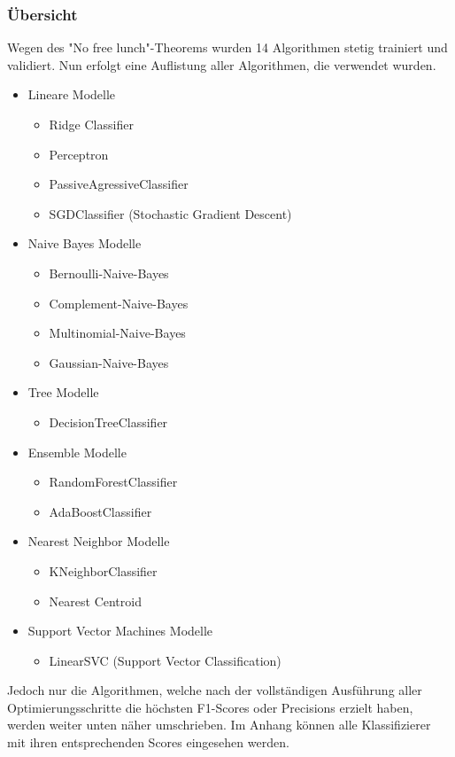 \subsubsection{Übersicht}
Wegen des "No free lunch"-Theorems wurden 14 Algorithmen stetig trainiert und validiert.
Nun erfolgt eine Auflistung aller Algorithmen, die verwendet wurden.
\begin{itemize}
	\item Lineare Modelle
	\begin{itemize}
		\item Ridge Classifier
		\item Perceptron
		\item PassiveAgressiveClassifier
		\item SGDClassifier (Stochastic Gradient Descent)
	\end{itemize}
	\item Naive Bayes Modelle
	\begin{itemize}
		\item Bernoulli-Naive-Bayes
		\item Complement-Naive-Bayes
		\item Multinomial-Naive-Bayes
		\item Gaussian-Naive-Bayes
	\end{itemize}
	\item Tree Modelle
	\begin{itemize}
		\item DecisionTreeClassifier
	\end{itemize}
	\item Ensemble Modelle
	\begin{itemize}
		\item RandomForestClassifier
		\item AdaBoostClassifier
	\end{itemize}
	\item Nearest Neighbor Modelle
	\begin{itemize}
		\item KNeighborClassifier
		\item Nearest Centroid
	\end{itemize}
	\item Support Vector Machines Modelle
	\begin{itemize}
		\item LinearSVC (Support Vector Classification)
	\end{itemize}
\end{itemize}
Jedoch nur die Algorithmen, welche nach der vollständigen Ausführung aller Optimierungsschritte die höchsten F1-Scores oder Precisions erzielt haben, werden weiter unten näher umschrieben.
Im Anhang können alle Klassifizierer mit ihren entsprechenden Scores eingesehen werden.
